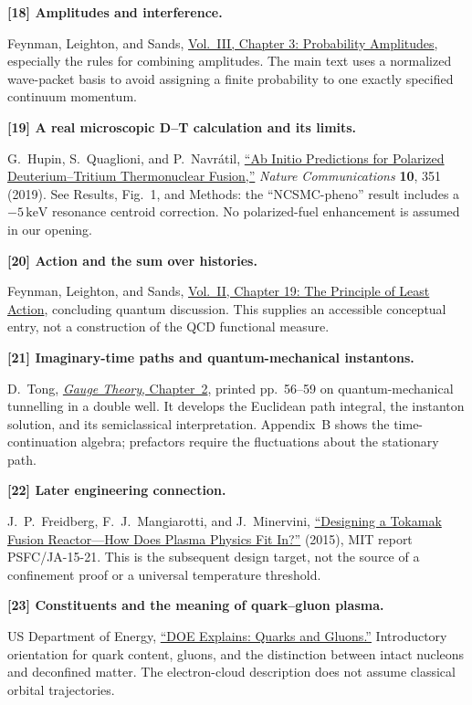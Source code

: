 \documentclass[11pt]{article}
\newcommand{\source}[3]{\par\medskip\hypertarget{src#1}{}\textbf{[#1] #2}\par\nopagebreak #3\par}
\begin{document}
\source{18}{Amplitudes and interference.}{Feynman, Leighton, and Sands,
\href{https://www.feynmanlectures.caltech.edu/III_03.html}{Vol.~III, Chapter 3:
Probability Amplitudes}, especially the rules for combining amplitudes. The
main text uses a normalized wave-packet basis to avoid assigning a finite
probability to one exactly specified continuum momentum.}

\source{19}{A real microscopic D--T calculation and its limits.}{G.~Hupin,
S.~Quaglioni, and P.~Navr\'atil,
\href{https://www.nature.com/articles/s41467-018-08052-6}{``Ab Initio Predictions
for Polarized Deuterium--Tritium Thermonuclear Fusion,''}
\emph{Nature Communications} \textbf{10}, 351 (2019). See Results, Fig.~1,
and Methods: the ``NCSMC-pheno'' result includes a $-5\,\mathrm{keV}$ resonance
centroid correction. No polarized-fuel enhancement is assumed in our opening.}

\source{20}{Action and the sum over histories.}{Feynman, Leighton, and Sands,
\href{https://www.feynmanlectures.caltech.edu/II_19.html}{Vol.~II, Chapter 19:
The Principle of Least Action}, concluding quantum discussion. This supplies
an accessible conceptual entry, not a construction of the QCD functional measure.}

\source{21}{Imaginary-time paths and quantum-mechanical instantons.}{D.~Tong,
\href{https://davidtong.org/pdfs/teaching/gauge-theory/gauge2.pdf}{
\emph{Gauge Theory}, Chapter~2}, printed pp.~56--59 on quantum-mechanical
tunnelling in a double well. It develops the Euclidean path integral, the
instanton solution, and its semiclassical interpretation. Appendix~B
shows the time-continuation algebra; prefactors require the fluctuations
about the stationary path.}

\source{22}{Later engineering connection.}{J.~P.~Freidberg, F.~J.~Mangiarotti,
and J.~Minervini,
\href{https://library.psfc.mit.edu/catalog/reports/2010/15ja/15ja021/15ja021_full.pdf}{
``Designing a Tokamak Fusion Reactor---How Does Plasma Physics Fit In?''}
(2015), MIT report PSFC/JA-15-21. This is the subsequent design target, not the
source of a confinement proof or a universal temperature threshold.}

\source{23}{Constituents and the meaning of quark--gluon plasma.}{US Department of
Energy, \href{https://www.energy.gov/science/doe-explainsquarks-and-gluons}{``DOE
Explains: Quarks and Gluons.''} Introductory orientation for quark content,
gluons, and the distinction between intact nucleons and deconfined matter.
The electron-cloud description does not assume classical orbital trajectories.}
\end{document}
